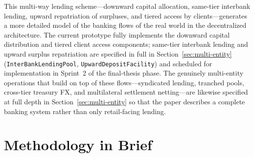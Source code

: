 \documentclass[12pt,a4paper]{report}
\begin{document}
This multi-way lending scheme---downward capital allocation, same-tier interbank lending, upward repatriation of surpluses, and tiered access by clients---generates a more detailed model of the banking flows of the real world in the decentralized architecture. The current prototype fully implements the downward capital distribution and tiered client access components; same-tier interbank lending and upward surplus repatriation are specified in full in Section~\ref{sec:multi-entity} (\texttt{InterBankLendingPool}, \texttt{UpwardDepositFacility}) and scheduled for implementation in Sprint~2 of the final-thesis phase. The genuinely multi-entity operations that build on top of these flows---syndicated lending, tranched pools, cross-tier treasury FX, and multilateral settlement netting---are likewise specified at full depth in Section~\ref{sec:multi-entity} so that the paper describes a complete banking system rather than only retail-facing lending.

\section{Methodology in Brief}
\end{document}
